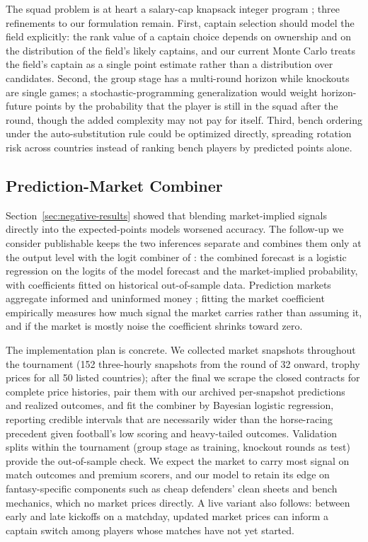 The squad problem is at heart a salary-cap knapsack integer program
\citep{winston2022mathletics}; three refinements to our formulation
remain. First, captain selection should model the field explicitly:
the rank value of a captain choice depends on ownership and on the
distribution of the field's likely captains, and our current Monte
Carlo treats the field's captain as a single point estimate rather
than a distribution over candidates. Second, the group stage has a
multi-round horizon while knockouts are single games; a
stochastic-programming generalization would weight horizon-future
points by the probability that the player is still in the squad after
the round, though the added complexity may not pay for itself. Third,
bench ordering under the auto-substitution rule could be optimized
directly, spreading rotation risk across countries instead of ranking
bench players by predicted points alone.

\subsection{Prediction-Market Combiner}
\label{sec:future-markets}

Section~\ref{sec:negative-results} showed that blending market-implied
signals directly into the expected-points models worsened accuracy.
The follow-up we consider publishable keeps the two inferences
separate and combines them only at the output level with the logit
combiner of \citet{benter1994computer}: the combined forecast is a
logistic regression on the logits of the model forecast and the
market-implied probability, with coefficients fitted on historical
out-of-sample data. Prediction markets aggregate informed and
uninformed money \citep{wolfers2004prediction}; fitting the market
coefficient empirically measures how much signal the market carries
rather than assuming it, and if the market is mostly noise the
coefficient shrinks toward zero.

The implementation plan is concrete. We collected market snapshots
throughout the tournament (152 three-hourly snapshots from the round
of 32 onward, trophy prices for all 50 listed countries); after the final we scrape the closed
contracts for complete price histories, pair them with our archived
per-snapshot predictions and realized outcomes, and fit the combiner
by Bayesian logistic regression, reporting credible intervals that are
necessarily wider than the horse-racing precedent given football's low
scoring and heavy-tailed outcomes. Validation splits within the
tournament (group stage as training, knockout rounds as test) provide
the out-of-sample check. We expect the market to carry most signal on
match outcomes and premium scorers, and our model to retain its edge
on fantasy-specific components such as cheap defenders' clean sheets
and bench mechanics, which no market prices directly. A live variant
also follows: between early and late kickoffs on a matchday, updated
market prices can inform a captain switch among players whose matches
have not yet started.

